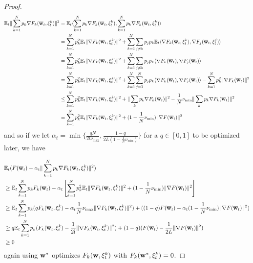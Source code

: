 \begin{proof}
	\begin{align*}
	\mathbb{E}_{t}\|\sum_{k=1}^{N}p_{k}\nabla F_{k}({\overline{\mathbf{w}}}_{t},\xi_{t}^{k})\|^{2} & =\mathbb{E}_{t}\langle\sum_{k=1}^{N}p_{k}\nabla F_{k}({\overline{\mathbf{w}}}_{t},\xi_{t}^{k}),\sum_{k=1}^{N}p_{k}\nabla F_{k}({\overline{\mathbf{w}}}_{t},\xi_{t}^{k})\rangle\\
	& =\sum_{k=1}^{N}p_{k}^{2}\mathbb{E}_{t}\|\nabla F_{k}({\overline{\mathbf{w}}}_{t},\xi_{t}^{k})\|^{2}+\sum_{k=1}^{N}\sum_{j\neq k}p_{j}p_{k}\mathbb{E}_{t}\langle\nabla F_{k}({\overline{\mathbf{w}}}_{t},\xi_{t}^{k}),\nabla F_{j}({\overline{\mathbf{w}}}_{t},\xi_{t}^{j})\rangle\\
	& =\sum_{k=1}^{N}p_{k}^{2}\mathbb{E}_{t}\|\nabla F_{k}({\overline{\mathbf{w}}}_{t},\xi_{t}^{k})\|^{2}+\sum_{k=1}^{N}\sum_{j\neq k}p_{j}p_{k}\langle\nabla F_{k}({\overline{\mathbf{w}}}_{t}),\nabla F_{j}({\overline{\mathbf{w}}}_{t})\rangle\\
	& =\sum_{k=1}^{N}p_{k}^{2}\mathbb{E}_{t}\|\nabla F_{k}({\overline{\mathbf{w}}}_{t},\xi_{t}^{k})\|^{2}+\sum_{k=1}^{N}\sum_{j=1}^{N}p_{j}p_{k}\langle\nabla F_{k}({\overline{\mathbf{w}}}_{t}),\nabla F_{j}({\overline{\mathbf{w}}}_{t})\rangle-\sum_{k=1}^{N}p_{k}^{2}\|\nabla F_{k}({\overline{\mathbf{w}}}_{t})\|^{2}\\
	& \leq\sum_{k=1}^{N}p_{k}^{2}\mathbb{E}_{t}\|\nabla F_{k}({\overline{\mathbf{w}}}_{t},\xi_{t}^{k})\|^{2}+\|\sum_{k}p_{k}\nabla F_{k}({\overline{\mathbf{w}}}_{t})\|^{2}-\frac{1}{N}\nu_{\min}\|\sum_{k}p_{k}\nabla F_{k}({\overline{\mathbf{w}}}_{t})\|^{2}\\
	& =\sum_{k=1}^{N}p_{k}^{2}\mathbb{E}_{t}\|\nabla F_{k}({\overline{\mathbf{w}}}_{t},\xi_{t}^{k})\|^{2}+(1-\frac{1}{N}\nu_{\min})\|\nabla F({\overline{\mathbf{w}}}_{t})\|^{2}
	\end{align*}
	and so if we let $\alpha_{t}=\min\{\frac{qN}{2l\nu_{\max}},\frac{1-q}{2L(1-\frac{1}{N}\nu_{\min})}\}$
	for a $q\in[0,1]$ to be optimized later, we have 
	
	\begin{align*}
	& \mathbb{E}_{t}(F({\overline{\mathbf{w}}}_{t})-\alpha_{t}\|\sum_{k=1}^{N}p_{k}\nabla F_{k}({\overline{\mathbf{w}}}_{t},\xi_{t}^{k})\|^{2})\\
	& \geq\mathbb{E}_{t}\sum_{k=1}^{N}p_{k}F_{k}({\overline{\mathbf{w}}}_{t})-\alpha_{t}\left[\sum_{k=1}^{N}p_{k}^{2}\mathbb{E}_{t}\|\nabla F_{k}({\overline{\mathbf{w}}}_{t},\xi_{t}^{k})\|^{2}+(1-\frac{1}{N}\nu_{\min})\|\nabla F({\overline{\mathbf{w}}}_{t})\|^{2}\right]\\
	& \geq\mathbb{E}_{t}\sum_{k=1}^{N}p_{k}(qF_{k}({\overline{\mathbf{w}}}_{t},\xi_{t}^{k})-\alpha_{t}\frac{1}{N}\nu_{\max}\|\nabla F_{k}({\overline{\mathbf{w}}}_{t},\xi_{t}^{k})\|^{2})+((1-q)F({\overline{\mathbf{w}}}_{t})-\alpha_{t}(1-\frac{1}{N}\nu_{\min})\|\nabla F({\overline{\mathbf{w}}}_{t})\|^{2})\\
	& \geq q\mathbb{E}_{t}\sum_{k=1}^{N}p_{k}(F_{k}({\overline{\mathbf{w}}}_{t},\xi_{t}^{k})-\frac{1}{2l}\|\nabla F_{k}({\overline{\mathbf{w}}}_{t},\xi_{t}^{k})\|^{2})+(1-q)(F({\overline{\mathbf{w}}}_{t})-\frac{1}{2L}\|\nabla F({\overline{\mathbf{w}}}_{t})\|^{2})\\
	& \geq0
	\end{align*}
	again using ${\mathbf{w}}^{\ast}$ optimizes $F_{k}({\mathbf{w}},\xi_{t}^{k})$ with $F_{k}({\mathbf{w}}^{\ast},\xi_{t}^{k})=0$. 
	

\end{proof}
